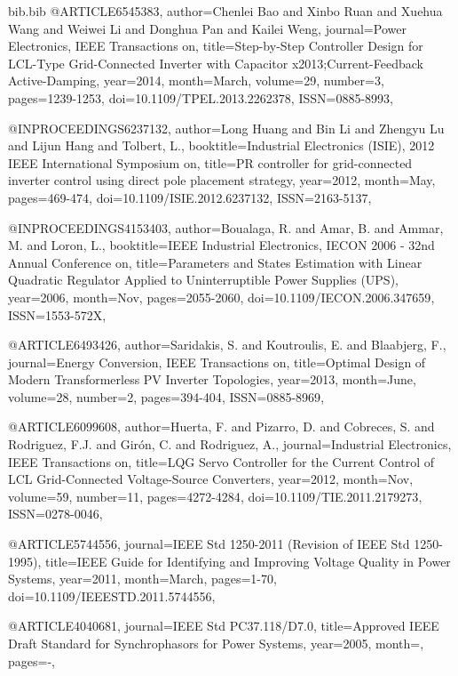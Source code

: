 \begin{filecontents}{bib.bib}
@ARTICLE{6545383, 
author={Chenlei Bao and Xinbo Ruan and Xuehua Wang and Weiwei Li and Donghua Pan and Kailei Weng}, 
journal={Power Electronics, IEEE Transactions on}, 
title={Step-by-Step Controller Design for LCL-Type Grid-Connected Inverter with Capacitor x2013;Current-Feedback Active-Damping}, 
year={2014}, 
month={March}, 
volume={29}, 
number={3}, 
pages={1239-1253}, 
doi={10.1109/TPEL.2013.2262378}, 
ISSN={0885-8993},}

@INPROCEEDINGS{6237132, 
author={Long Huang and Bin Li and Zhengyu Lu and Lijun Hang and Tolbert, L.}, 
booktitle={Industrial Electronics (ISIE), 2012 IEEE International Symposium on}, 
title={PR controller for grid-connected inverter control using direct pole placement strategy}, 
year={2012}, 
month={May}, 
pages={469-474}, 
doi={10.1109/ISIE.2012.6237132}, 
ISSN={2163-5137},}

@INPROCEEDINGS{4153403, 
author={Boualaga, R. and Amar, B. and Ammar, M. and Loron, L.}, 
booktitle={IEEE Industrial Electronics, IECON 2006 - 32nd Annual Conference on}, 
title={Parameters and States Estimation with Linear Quadratic Regulator Applied to Uninterruptible Power Supplies (UPS)}, 
year={2006}, 
month={Nov}, 
pages={2055-2060}, 
doi={10.1109/IECON.2006.347659}, 
ISSN={1553-572X},}

@ARTICLE{6493426, 
author={Saridakis, S. and Koutroulis, E. and Blaabjerg, F.}, 
journal={Energy Conversion, IEEE Transactions on}, 
title={Optimal Design of Modern Transformerless PV Inverter Topologies}, 
year={2013}, 
month={June}, 
volume={28}, 
number={2}, 
pages={394-404}, 
ISSN={0885-8969},}

@ARTICLE{6099608, 
author={Huerta, F. and Pizarro, D. and Cobreces, S. and Rodriguez, F.J. and Girón, C. and Rodriguez, A.}, 
journal={Industrial Electronics, IEEE Transactions on}, 
title={LQG Servo Controller for the Current Control of  LCL Grid-Connected Voltage-Source Converters}, 
year={2012}, 
month={Nov}, 
volume={59}, 
number={11}, 
pages={4272-4284}, 
doi={10.1109/TIE.2011.2179273}, 
ISSN={0278-0046},}

@ARTICLE{5744556, 
journal={IEEE Std 1250-2011 (Revision of IEEE Std 1250-1995)}, 
title={IEEE Guide for Identifying and Improving Voltage Quality in Power Systems}, 
year={2011}, 
month={March}, 
pages={1-70}, 
doi={10.1109/IEEESTD.2011.5744556},}

@ARTICLE{4040681, 
journal={IEEE Std PC37.118/D7.0}, 
title={Approved IEEE Draft Standard for Synchrophasors for Power Systems}, 
year={2005}, 
month={}, 
pages={-},}


\end{filecontents}

